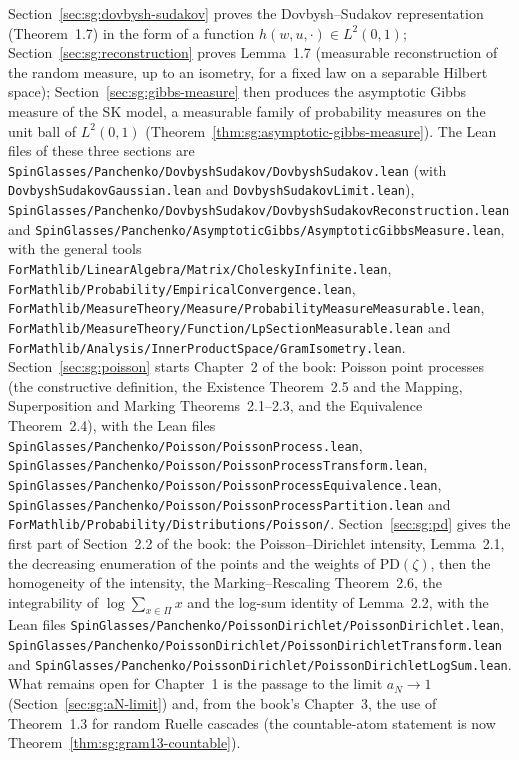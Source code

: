 Section~\ref{sec:sg:dovbysh-sudakov} proves the Dovbysh--Sudakov representation (Theorem~1.7) in the form of a function $h(w,u,\cdot)\in L^2(0,1)$; Section~\ref{sec:sg:reconstruction} proves Lemma~1.7 (measurable reconstruction of the random measure, up to an isometry, for a fixed law on a separable Hilbert space); Section~\ref{sec:sg:gibbs-measure} then produces the asymptotic Gibbs measure of the SK model, a measurable family of probability measures on the unit ball of $L^2(0,1)$ (Theorem~\ref{thm:sg:asymptotic-gibbs-measure}). The Lean files of these three sections are \texttt{SpinGlasses/Panchenko/DovbyshSudakov/DovbyshSudakov.lean} (with \texttt{DovbyshSudakovGaussian.lean} and \texttt{DovbyshSudakovLimit.lean}), \texttt{SpinGlasses/Panchenko/DovbyshSudakov/DovbyshSudakovReconstruction.lean} and \texttt{SpinGlasses/Panchenko/AsymptoticGibbs/AsymptoticGibbsMeasure.lean}, with the general tools \texttt{ForMathlib/LinearAlgebra/Matrix/CholeskyInfinite.lean}, \texttt{ForMathlib/Probability/EmpiricalConvergence.lean}, \texttt{ForMathlib/MeasureTheory/Measure/ProbabilityMeasureMeasurable.lean}, \texttt{ForMathlib/MeasureTheory/Function/LpSectionMeasurable.lean} and \texttt{ForMathlib/Analysis/InnerProductSpace/GramIsometry.lean}. Section~\ref{sec:sg:poisson} starts Chapter~2 of the book: Poisson point processes (the constructive definition, the Existence Theorem~2.5 and the Mapping, Superposition and Marking Theorems~2.1--2.3, and the Equivalence Theorem~2.4), with the Lean files \texttt{SpinGlasses/Panchenko/Poisson/PoissonProcess.lean}, \texttt{SpinGlasses/Panchenko/Poisson/PoissonProcessTransform.lean}, \texttt{SpinGlasses/Panchenko/Poisson/PoissonProcessEquivalence.lean}, \texttt{SpinGlasses/Panchenko/Poisson/PoissonProcessPartition.lean} and \texttt{ForMathlib/Probability/Distributions/Poisson/}. Section~\ref{sec:sg:pd} gives the first part of Section~2.2 of the book: the Poisson--Dirichlet intensity, Lemma~2.1, the decreasing enumeration of the points and the weights of $\mathrm{PD}(\zeta)$, then the homogeneity of the intensity, the Marking--Rescaling Theorem~2.6, the integrability of $\log\sum_{x\in\Pi}x$ and the log-sum identity of Lemma~2.2, with the Lean files \texttt{SpinGlasses/Panchenko/PoissonDirichlet/PoissonDirichlet.lean}, \texttt{SpinGlasses/Panchenko/PoissonDirichlet/PoissonDirichletTransform.lean} and \texttt{SpinGlasses/Panchenko/PoissonDirichlet/PoissonDirichletLogSum.lean}. What remains open for Chapter~1 is the passage to the limit $a_N\to1$ (Section~\ref{sec:sg:aN-limit}) and, from the book's Chapter~3, the use of Theorem~1.3 for random Ruelle cascades (the countable-atom statement is now Theorem~\ref{thm:sg:gram13-countable}).



